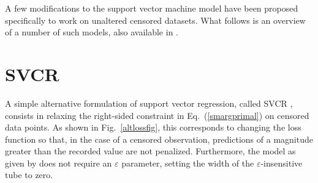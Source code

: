 \documentclass[12pt]{report}
\begin{document}
A few modifications to the support vector machine model have been proposed specifically to work on unaltered censored datasets. What follows is an overview of a number of such models, also available in \cite{vanbelle11}.

\section{SVCR}
A simple alternative formulation of support vector regression, called SVCR \cite{shivaswamy07}, consists in relaxing the right-sided constraint in Eq.\ (\ref{smargprimal}) on censored data points. As shown in Fig.\ \ref{altlossfig}, this corresponds to changing the loss function so that, in the case of a censored observation, predictions of a magnitude greater than the recorded value are not penalized. Furthermore, the model as given by \cite{vanbelle11} does not require an $\varepsilon$ parameter, setting the width of the $\varepsilon$-insensitive tube to zero.
\end{document}
